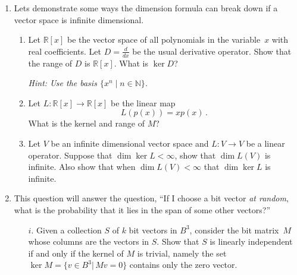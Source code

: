 \begin{enumerate}

\item %
Lets demonstrate some ways the dimension formula can break down if a vector space is infinite dimensional.
\begin{enumerate}
\item Let $\mathbb{R}[x]$ be the vector space of all polynomials  in the variable~$x$ with real coefficients. Let $D = \frac{d}{dx}$ be the usual derivative operator. Show that the range of $D$ is $\mathbb{R}[x]$. What is $\ker D$?

\emph{Hint: Use the basis $\{ x^n \mid n \in \mathbb{N} \}$.}

\item Let $L \colon \mathbb{R}[x] \rightarrow \mathbb{R}[x]$ be the linear map \[L(p(x)) = xp(x)\, .\]  What is the kernel and range of $M$?



\item Let $V$ be an infinite dimensional vector space and $L \colon V \rightarrow V$ be a linear operator. Suppose that $\dim \ker L < \infty$, show that $\dim L(V)$ is infinite. Also show that when $\dim L(V) < \infty$ that $\dim \ker L$ is infinite.
\end{enumerate}

\item This question will answer the question, ``If I choose a bit vector \emph{at random}, what is the probability that it lies in the span of some other vectors?''

\begin{itemize}
\item[$i.$] Given a collection $S$ of $k$ bit vectors in $B^3$, consider the bit matrix~$M$ whose columns are the vectors in $S$.  Show that $S$ is linearly independent if and only if the kernel of $M$ is trivial, namely the set $\ker M=\{v\in B^3| \, Mv=0\}$ contains only the zero vector.


\end{itemize}
\end{enumerate}
